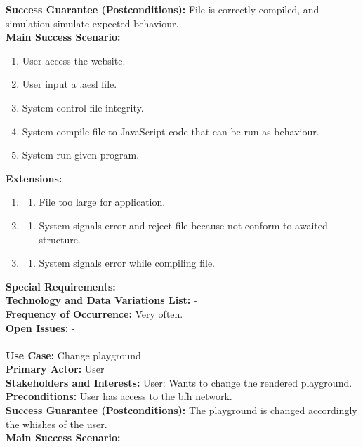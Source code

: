 \documentclass{scrbook}
\begin{document}
\textbf{Success Guarantee (Postconditions): }File is correctly compiled, and simulation simulate expected behaviour. \\
\textbf{Main Success Scenario: }
\begin{enumerate}
  \item User access the website.
  \item User input a .aesl file.
  \item System control file integrity.
  \item System compile file to JavaScript code that can be run as behaviour.
  \item System run given program.
\end{enumerate}
\textbf{Extensions: }
\begin{enumerate}\addtocounter{enumi}{1}
  \item 
  \begin{enumerate}
    \item File too large for application.
  \end{enumerate}
  \item
  \begin{enumerate}
    \item System signals error and reject file because not conform to awaited structure.
  \end{enumerate}
  \item 
  \begin{enumerate}
    \item System signals error while compiling file.
  \end{enumerate}
\end{enumerate}
\textbf{Special Requirements: }- \\
\textbf{Technology and Data Variations List: }- \\
\textbf{Frequency of Occurrence: }Very often. \\
\textbf{Open Issues: }- \\
\\
\textbf{Use Case: }Change playground \\
\textbf{Primary Actor: }User \\
\textbf{Stakeholders and Interests: }User: Wants to change the rendered playground. \\
\textbf{Preconditions: }User has access to the bfh network. \\
\textbf{Success Guarantee (Postconditions): }The playground is changed accordingly the whishes of the user. \\
\textbf{Main Success Scenario: }
\end{document}
